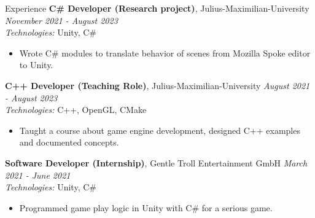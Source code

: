 \documentclass{resume} %
\begin{document}
\begin{rSection}{Experience}
{\bf C\# Developer (Research project)}{, Julius-Maximilian-University} \hfill {\em November 2021 - August 2023}\\
{\small {\em Technologies:} Unity, C\#} 
\begin{itemize}
    \item \small Wrote C\# modules to translate behavior of scenes from Mozilla Spoke editor to Unity.
\end{itemize}
{\bf C++ Developer (Teaching Role)}{, Julius-Maximilian-University} \hfill {\em August 2021 - August 2023}\\
{\small {\em Technologies:} C++, OpenGL, CMake}
\begin{itemize}
    \item \small Taught a course about game engine development, designed C++ examples and documented concepts.
\end{itemize}
{\bf Software Developer (Internship)}{, Gentle Troll Entertainment GmbH} \hfill {\em March 2021 - June 2021}\\
{\small {\em Technologies:} Unity, C\#}
\begin{itemize}
    \item \small Programmed game play logic in Unity with C\# for a serious game.
\end{itemize}
\end{rSection}
\end{document}

